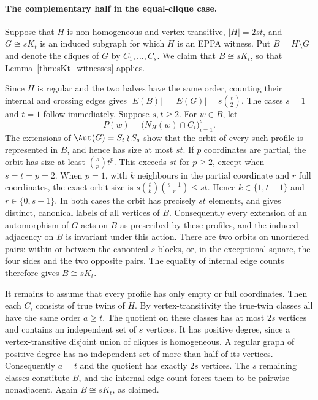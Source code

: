 
\paragraph{The complementary half in the equal-clique case.}
Suppose that $H$ is non-homogeneous and vertex-transitive,
$|H|=2st$, and $G\cong sK_t$ is an induced subgraph for which
$H$ is an EPPA witness. Put $B=H\setminus G$ and denote the
cliques of $G$ by $C_1,\ldots,C_s$. We claim that
$B\cong sK_t$, so that Lemma~\ref{thm:sKt_witnesses} applies.

Since $H$ is regular and the two halves have the same order,
counting their internal and crossing edges gives
$|E(B)|=|E(G)|=s\binom t2$.
The cases $s=1$ and $t=1$ follow immediately.
Suppose $s,t\ge2$. For $w\in B$, let
\[
  P(w)=\bigl(N_H(w)\cap C_i\bigr)_{i=1}^{s}.
\]
The extensions of $\Aut(G)=S_t\wr S_s$ show that the orbit
of every such profile is represented in $B$, and hence has
size at most $st$. If $p$ coordinates are partial, the orbit
has size at least $\binom sp t^p$. This exceeds $st$ for
$p\ge2$, except when $s=t=p=2$. When $p=1$, with $k$
neighbours in the partial coordinate and $r$ full coordinates,
the exact orbit size is
$s\binom tk\binom{s-1}r\le st$. Hence
$k\in\{1,t-1\}$ and $r\in\{0,s-1\}$.
In both cases the orbit has precisely $st$ elements,
and gives distinct, canonical labels of all vertices of $B$.
Consequently every extension of an automorphism of $G$ acts
on $B$ as prescribed by these profiles, and the induced
adjacency on $B$ is invariant under this action.
There are two orbits on unordered pairs: within or between
the canonical $s$ blocks, or, in the exceptional square,
the four sides and the two opposite pairs.
The equality of internal edge counts therefore gives
$B\cong sK_t$.

It remains to assume that every profile has only empty
or full coordinates. Then each $C_i$ consists of true twins
of $H$. By vertex-transitivity the true-twin classes all
have the same order $a\ge t$. The quotient on these classes
has at most $2s$ vertices and contains an independent
set of $s$ vertices. It has positive degree, since a
vertex-transitive disjoint union of cliques is homogeneous.
A regular graph of positive degree has no independent
set of more than half of its vertices. Consequently
$a=t$ and the quotient has exactly $2s$ vertices.
The $s$ remaining classes constitute $B$, and the
internal edge count forces them to be pairwise
nonadjacent. Again $B\cong sK_t$, as claimed.

